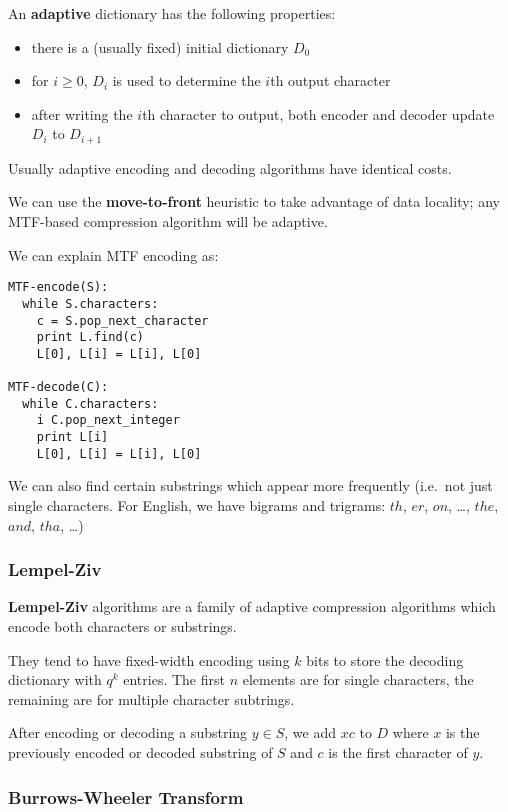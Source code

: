 \documentclass[12pt]{article}
\begin{document}
An {\bf adaptive} dictionary has the following properties:
\begin{itemize}
\item there is a (usually fixed) initial dictionary $D_0$
\item for $i \geq 0$, $D_i$ is used to determine the $i$th output character
\item after writing the $i$th character to output, both encoder and decoder update $D_i$ to $D_{i+1}$
\end{itemize}
Usually adaptive encoding and decoding algorithms have identical costs.

We can use the {\bf move-to-front} heuristic to take advantage of data locality; any MTF-based compression algorithm will be adaptive.

We can explain MTF encoding as:
\begin{verbatim}
MTF-encode(S):
  while S.characters:
    c = S.pop_next_character
    print L.find(c)
    L[0], L[i] = L[i], L[0]

MTF-decode(C):
  while C.characters:
    i C.pop_next_integer
    print L[i]
    L[0], L[i] = L[i], L[0]
\end{verbatim}

We can also find certain substrings which appear more frequently (i.e.\ not just single characters. For English, we have bigrams and trigrams: $th$, $er$, $on$, \dots, $the$, $and$, $tha$, \dots)

\subsubsection{Lempel-Ziv}
{\bf Lempel-Ziv} algorithms are a family of adaptive compression algorithms which encode both characters or substrings.

They tend to have fixed-width encoding using $k$ bits to store the decoding dictionary with $q^k$ entries. The first $n$ elements are for single characters, the remaining are for multiple character subtrings.

After encoding or decoding a substring $y \in S$, we add $xc$ to $D$ where $x$ is the previously encoded or decoded substring of $S$ and $c$ is the first character of $y$.

\subsubsection{Burrows-Wheeler Transform}
\end{document}
